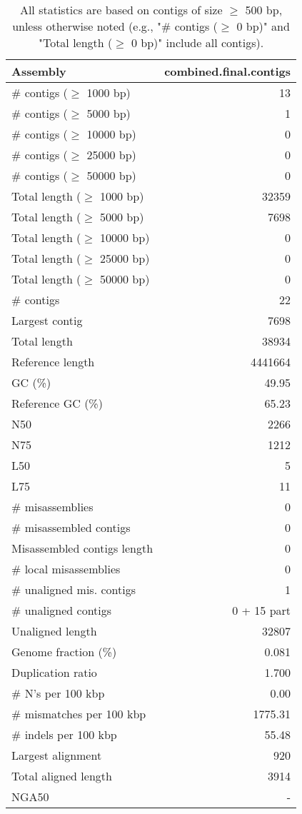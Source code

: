 \documentclass[12pt,a4paper]{article}
\begin{document}
\begin{table}[ht]
\begin{center}
\caption{All statistics are based on contigs of size $\geq$ 500 bp, unless otherwise noted (e.g., "\# contigs ($\geq$ 0 bp)" and "Total length ($\geq$ 0 bp)" include all contigs).}
\begin{tabular}{|l*{1}{|r}|}
\hline
Assembly & combined.final.contigs \\ \hline
\# contigs ($\geq$ 1000 bp) & 13 \\ \hline
\# contigs ($\geq$ 5000 bp) & 1 \\ \hline
\# contigs ($\geq$ 10000 bp) & 0 \\ \hline
\# contigs ($\geq$ 25000 bp) & 0 \\ \hline
\# contigs ($\geq$ 50000 bp) & 0 \\ \hline
Total length ($\geq$ 1000 bp) & 32359 \\ \hline
Total length ($\geq$ 5000 bp) & 7698 \\ \hline
Total length ($\geq$ 10000 bp) & 0 \\ \hline
Total length ($\geq$ 25000 bp) & 0 \\ \hline
Total length ($\geq$ 50000 bp) & 0 \\ \hline
\# contigs & 22 \\ \hline
Largest contig & 7698 \\ \hline
Total length & 38934 \\ \hline
Reference length & 4441664 \\ \hline
GC (\%) & 49.95 \\ \hline
Reference GC (\%) & 65.23 \\ \hline
N50 & 2266 \\ \hline
N75 & 1212 \\ \hline
L50 & 5 \\ \hline
L75 & 11 \\ \hline
\# misassemblies & 0 \\ \hline
\# misassembled contigs & 0 \\ \hline
Misassembled contigs length & 0 \\ \hline
\# local misassemblies & 0 \\ \hline
\# unaligned mis. contigs & 1 \\ \hline
\# unaligned contigs & 0 + 15 part \\ \hline
Unaligned length & 32807 \\ \hline
Genome fraction (\%) & 0.081 \\ \hline
Duplication ratio & 1.700 \\ \hline
\# N's per 100 kbp & 0.00 \\ \hline
\# mismatches per 100 kbp & 1775.31 \\ \hline
\# indels per 100 kbp & 55.48 \\ \hline
Largest alignment & 920 \\ \hline
Total aligned length & 3914 \\ \hline
NGA50 & - \\ \hline
\end{tabular}
\end{center}
\end{table}
\end{document}
